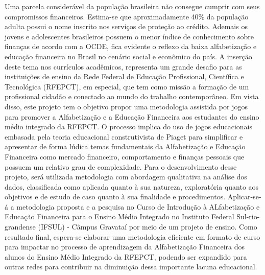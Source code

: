 Uma parcela considerável da população brasileira não consegue cumprir com seus compromissos financeiros. Estima-se que aproximadamente 40\% da população adulta possui o nome inscrito nos serviços de proteção ao crédito. Ademais os jovens e adolescentes brasileiros possuem o menor índice de conhecimento sobre finanças de acordo com a OCDE, fica evidente o reflexo da baixa alfabetização e educação financeira no Brasil no cenário social e econômico do país. A inserção deste tema nos currículos acadêmicos, representa um grande desafio para as instituições de ensino da Rede Federal de Educação Profissional, Científica e Tecnológica (RFEPCT), em especial, que tem como missão a formação de um profissional cidadão e conectado ao mundo do trabalho contemporâneo. Em vista disso, este projeto tem o objetivo propor uma metodologia assistida por jogos para promover a Alfabetização e a Educação Financeira aos estudantes do ensino médio integrado da RFEPCT. O processo implica do uso de jogos educacionais embasada pela teoria educacional construtivista de Piaget para simplificar e apresentar de forma lúdica temas fundamentais da Alfabetização e Educação Financeira como mercado financeiro, comportamento e finanças pessoais que possuem um relativo grau de complexidade. Para o desenvolvimento desse projeto, será utilizada metodologia com abordagem qualitativa na análise dos dados, classificada como aplicada quanto à sua natureza, exploratória quanto aos objetivos e de estudo de caso quanto à sua finalidade e procedimentos. Aplicar-se-á a metodologia proposta e a pesquisa no Curso de Introdução à ALfabetização e Educação Financeira para o Ensino Médio Integrado no Instituto Federal Sul-rio-grandense (IFSUL) - Câmpus Gravataí por meio de um projeto de ensino. Como resultado final, espera-se elaborar uma metodologia eficiente em formato de curso para impactar no processo de aprendizagem da Alfabetização Financeira dos alunos do Ensino Médio Integrado da RFEPCT, podendo ser expandido para outras redes para contribuir na diminuição dessa importante lacuna educacional.